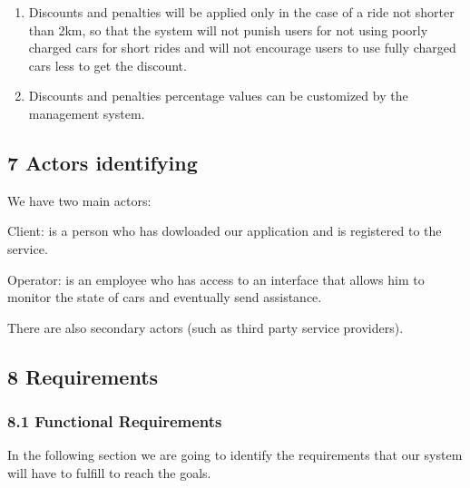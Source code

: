 \documentclass[]{article}
\providecommand{\tightlist}{%
  \setlength{\itemsep}{0pt}\setlength{\parskip}{0pt}}
\begin{document}
\begin{enumerate}
\def\labelenumi{\arabic{enumi}.}
\tightlist
\item
  Discounts and penalties will be applied only in the case of a ride not
  shorter than 2km, so that the system will not punish users for not
  using poorly charged cars for short rides and will not encourage users
  to use fully charged cars less to get the discount.
\item
  Discounts and penalties percentage values can be customized by the
  management system.
\end{enumerate}

\subsection{7 Actors identifying}\label{actors-identifying}

We have two main actors:

Client: is a person who has dowloaded our application and is registered
to the service.

Operator: is an employee who has access to an interface that allows him
to monitor the state of cars and eventually send assistance.

There are also secondary actors (such as third party service providers).

\subsection{8 Requirements}\label{requirements}

\subsubsection{8.1 Functional
Requirements}\label{functional-requirements}

In the following section we are going to identify the requirements that
our system will have to fulfill to reach the goals.
\end{document}
